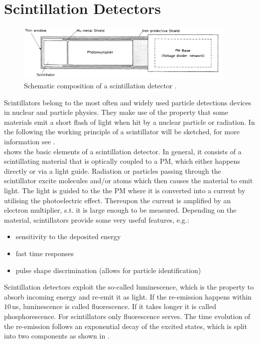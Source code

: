 \documentclass[british,11pt,a4paper]{memoir}
\begin{document}
\section{Scintillation Detectors}
\begin{figure}[ht]
	\centering
	\includegraphics[width=0.94\textwidth]{scint}
	\caption{Schematic composition of a scintillation detector \cite{leo}.}
	\label{pscint}
\end{figure}\no
Scintillators belong to the most often and widely used particle detections devices in nuclear and particle physics. They make use of the property that some materials emit a short flash of light when hit by a nuclear particle or radiation. In the following the working principle of a scintillator will be sketched, for more information see \cite{leo}.\\
 shows the basic elements of a scintillation detector. In general, it consists of a scintillating material that is optically coupled to a \ac{PM}, which either happens directly or via a light guide. Radiation or particles passing through the scintillator excite molecules and/or atoms which then causes the material to emit light. The light is guided to the the \ac{PM} where it is converted into a current by utilising the photoelectric effect. Thereupon the current is amplified by an electron multiplier, s.t. it is large enough to be measured. Depending on the material, scintillators provide some very useful features, e.g.:
\begin{itemize}
	\item sensitivity to the deposited energy
	\item fast time responses
	\item pulse shape discrimination (allows for particle identification)
\end{itemize}
Scintillation detectors exploit the so-called luminescence, which is the property to absorb incoming energy and re-emit it as light. If the re-emission happens within $10\,$ns, luminescence is called fluorescence. If it takes longer it is called phosphorescence. For scintillators only fluorescence serves. The time evolution of the re-emission follows an exponential decay of the excited states, which is split into two components as shown in .\\
\end{document}
